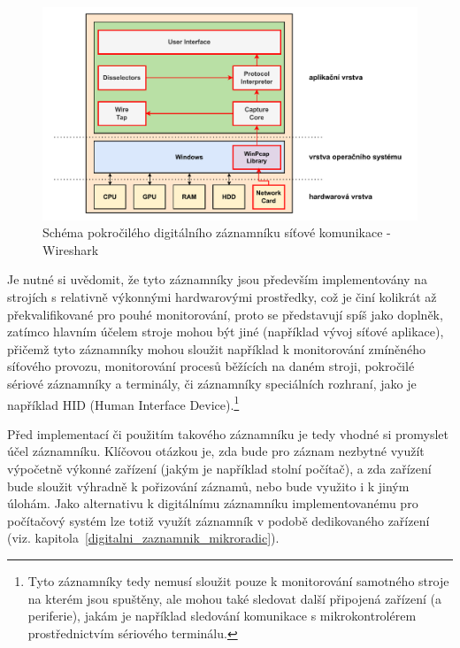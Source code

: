 \begin{figure}[h]
    \centering
    \includegraphics[width=1.00\textwidth]{obrazky-figures/wireshark.pdf}
    
    \caption{Schéma pokročilého digitálního záznamníku síťové komunikace - Wireshark \cite{researchgate_wireshark_architecture, winpcap_architecture}}
    \label{fig:computer-recorder}
\end{figure}

Je nutné si uvědomit, že tyto záznamníky jsou především implementovány na strojích s relativně výkonnými hardwarovými prostředky, což je činí kolikrát až překvalifikované pro pouhé monitorování, proto se představují spíš jako doplněk, zatímco hlavním účelem stroje mohou být jiné (například vývoj síťové aplikace), přičemž tyto záznamníky mohou sloužit například k monitorování zmíněného síťového provozu, monitorování procesů běžících na daném stroji, pokročilé sériové záznamníky a terminály, či záznamníky speciálních rozhraní, jako je například HID (Human Interface Device).\footnote{Tyto záznamníky tedy nemusí sloužit pouze k monitorování samotného stroje na kterém jsou spuštěny, ale mohou také sledovat další připojená zařízení (a periferie), jakám je například sledování komunikace s mikrokontrolérem prostřednictvím sériového terminálu.}

Před implementací či použitím takového záznamníku je tedy vhodné si promyslet účel záznamníku. Klíčovou otázkou je, zda bude pro záznam nezbytné využít výpočetně výkonné zařízení (jakým je například stolní počítač), a zda zařízení bude sloužit výhradně k pořizování záznamů, nebo bude využito i k jiným úlohám. Jako alternativu k digitálnímu záznamníku implementovanému pro počítačový systém lze totiž využít záznamník v podobě dedikovaného zařízení (viz. kapitola~\ref{digitalni_zaznamnik_mikroradic}).

